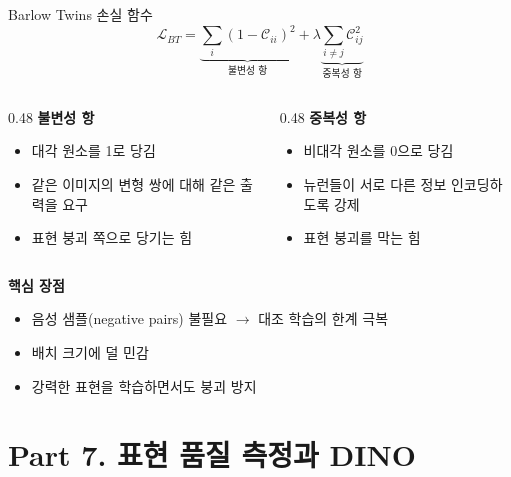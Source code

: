 \documentclass[aspectratio=169,10pt]{beamer}
\begin{document}
\begin{frame}{Barlow Twins 손실 함수}
\[
\mathcal{L}_{BT} = \underbrace{\sum_i (1 - \mathcal{C}_{ii})^2}_{\text{불변성 항}} + \lambda \underbrace{\sum_{i \neq j} \mathcal{C}_{ij}^2}_{\text{중복성 항}}
\]

\begin{columns}[T]
\begin{column}{0.48\textwidth}
\textbf{불변성 항}
\begin{itemize}
  \item 대각 원소를 1로 당김
  \item 같은 이미지의 변형 쌍에 대해 같은 출력을 요구
  \item 표현 붕괴 쪽으로 \alert{당기는 힘}
\end{itemize}
\end{column}
\begin{column}{0.48\textwidth}
\textbf{중복성 항}
\begin{itemize}
  \item 비대각 원소를 0으로 당김
  \item 뉴런들이 \alert{서로 다른 정보} 인코딩하도록 강제
  \item 표현 붕괴를 \alert{막는 힘}
\end{itemize}
\end{column}
\end{columns}

\vspace{0.8em}
\textbf{핵심 장점}
\begin{itemize}
  \item 음성 샘플(negative pairs) \alert{불필요} $\to$ 대조 학습의 한계 극복
  \item 배치 크기에 덜 민감
  \item 강력한 표현을 학습하면서도 붕괴 방지
\end{itemize}
\end{frame}

\section{Part 7. 표현 품질 측정과 DINO}
\end{document}

